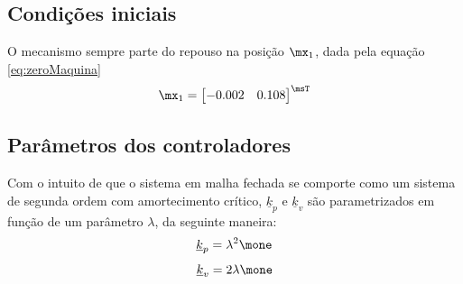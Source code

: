 \documentclass[]{politex}
\begin{document}
\subsection{Condições iniciais}

O mecanismo sempre parte do repouso na posição $\mx_1$, dada pela equação \eqref{eq:zeroMaquina}
\begin{equation} \label{eq:zeroMaquina}
\mx_1 = \begin{bmatrix}
-0.002 & 0.108 
\end{bmatrix}^\msT
\end{equation}

\subsection{Parâmetros dos controladores}

Com o intuito de que o sistema em malha fechada se comporte como um sistema de segunda ordem com amortecimento crítico, $\underline{k}_p$ e $\underline{k}_v$ são parametrizados em função de um parâmetro $\lambda$, da seguinte maneira:
\begin{equation}
\underline{k}_p = \lambda^2 \mone
\end{equation}
\begin{equation}
\underline{k}_v = 2 \lambda \mone
\end{equation}
\end{document}
